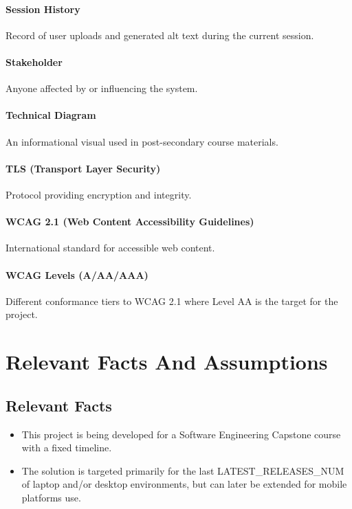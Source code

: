 \documentclass[12pt]{article}
\begin{document}
\paragraph*{Session History}
 Record of user uploads and generated alt text during the current session.

 \paragraph*{Stakeholder}
 Anyone affected by or influencing the system.

 \paragraph*{Technical Diagram}
 An informational visual used in post-secondary course materials. 

 \paragraph*{TLS (Transport Layer Security)}
 Protocol providing encryption and integrity.

 \paragraph*{WCAG 2.1 (Web Content Accessibility Guidelines)}
 International standard for accessible web content.

 \paragraph*{WCAG Levels (A/AA/AAA)}
 Different conformance tiers to WCAG 2.1 where Level AA is the target for the project.


\section{Relevant Facts And Assumptions}
\subsection{Relevant Facts}
\begin{itemize}
  \item This project is being developed for a Software Engineering
    Capstone course with a fixed timeline.
  \item The solution is targeted primarily for the last LATEST\_RELEASES\_NUM of laptop and/or desktop
    environments, but can later be extended for mobile platforms use.
\end{itemize}
\end{document}
